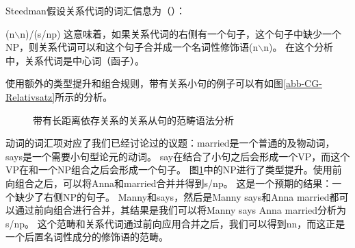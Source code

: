 Steedman假设关系代词的词汇信息为（）：

\ea
\label{le-Relativpronomen-CG}
(n$\backslash$n)/(s/np)
\z
这意味着，如果关系代词的右侧有一个句子，这个句子中缺少一个NP，则关系代词可以和这个句子合并成一个名词性修饰语(n$\backslash$n)。
在这个分析中，关系代词是中心词（函子）。

使用额外的类型提升和组合规则，带有关系小句的例子可以有如图\vref{abb-CG-Relativsatz}所示的分析。
%
\begin{figure}
\centerline{%
}
\caption{\label{abb-CG-Relativsatz}带有长距离依存关系的关系从句的范畴语法分析}
\end{figure}%
%
动词的词汇项对应了我们已经讨论过的议题：married是一个普通的及物动词，says是一个需要小句型论元的动词。
say在结合了小句之后会形成一个VP，而这个VP在和一个NP组合之后会形成一个句子。
图\ref{abb-CG-Relativsatz}中的NP进行了类型提升。使用前向组合之后，可以将Anna和married合并并得到s/np。
这是一个预期的结果：一个缺少了右侧NP的句子。
Manny和says，然后是Manny says和Anna married都可以通过前向组合进行合并，其结果是我们可以将Manny says Anna married分析为s/np。
这个范畴和关系代词通过前向应用合并之后，我们可以得到n\bs n，而这正是一个后置名词性成分的修饰语的范畴。


